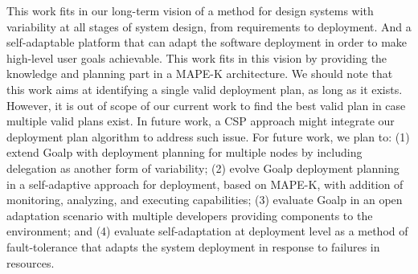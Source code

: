 This work fits in our long-term vision of a method for design systems with variability at all stages of system design, from requirements to deployment. And a self-adaptable platform that can adapt the software deployment in order to make high-level user goals achievable. This work fits in this vision by providing the knowledge and planning part in a MAPE-K\cite{kephart_vision_2003} architecture.
We should note that this work aims at identifying a single valid deployment plan, as long as it exists. However, it is out of scope of our current work to find the best valid plan in case multiple valid plans exist. In future work, a CSP approach might integrate our deployment plan algorithm to address such issue.
For future work, we plan to: (1) extend Goalp with deployment planning for multiple nodes by including delegation as another form of variability;  (2) evolve Goalp deployment planning in a self-adaptive approach for deployment, based on MAPE-K, with addition of monitoring, analyzing, and executing capabilities; (3) evaluate Goalp in an open adaptation scenario with multiple developers providing components to the environment; and (4) evaluate self-adaptation at deployment level as a method of fault-tolerance that adapts the system deployment in response to failures in resources.

